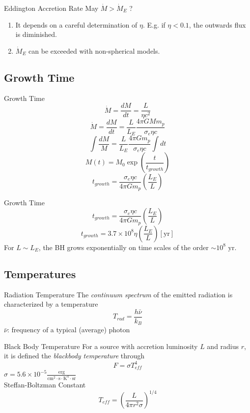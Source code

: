 \documentclass{beamer}
\begin{document}
\begin{frame}{Eddington Accretion Rate}
	May $\dot{M} > \dot{M}_E$ ?
	\pause
	\begin{enumerate}
		\item It depends on a careful determination of $\eta$. E.g. if $\eta < 0.1$, the outwards flux is diminished.
		\pause
		\item $\dot{M}_E$ can be exceeded with non-spherical models.
	\end{enumerate}
\end{frame}

\subsection{Growth Time}
\begin{frame}{Growth Time}
	\[ \dot{M} = \frac{dM}{dt} = \frac{L}{\eta c^2} \]
	\pause
	\[ \dot{M} = \frac{dM}{dt} = \frac{L}{L_E} \frac{4 \pi GM m_p}{\sigma_e \eta c} \]
	\pause
	\[ \int \frac{dM}{M} = \frac{L}{L_E} \frac{4 \pi G m_p}{\sigma_e \eta c} \int dt \]
	\pause
	\[ M(t) = M_0 \exp \left( \frac{t}{t_{growth} }\right) \]
	\pause
	\[ t_{growth} = \frac{\sigma_e \eta c}{4 \pi G m_p} \left( \frac{L_E}{L} \right) \]
\end{frame}

\begin{frame}{Growth Time}
	\[ t_{growth} = \frac{\sigma_e \eta c}{4 \pi G m_p} \left( \frac{L_E}{L} \right) \]
	\pause
	\[ t_{growth} = 3.7 \times 10^8 \eta \left( \frac{L_E}{L} \right) [\textrm{yr}]\]
	\pause
	\footnotesize
	For $L \sim L_E$, the BH grows exponentially on time scales of the order $\sim 10^8 \textrm{ yr}$.
\end{frame}

\subsection{Temperatures}
\begin{frame}{Radiation Temperature}
	The \textit{continuum spectrum} of the emitted radiation is characterized by a temperature
	\[ T_{rad} = \frac{h\bar{\nu}}{k_B}\]
	\pause	
	$\bar{\nu}$: frequency of a typical (average) photon
\end{frame}

\begin{frame}{Black Body Temperature}
	For a source with accretion luminosity $L$ and radius $r$, it is defined the \textit{blackbody temperature} through
	\[F= \sigma T_{eff}^4 \]
	\pause	
	$\sigma = 5.6 \times 10^{-5} \frac{\textrm{erg}}{\textrm{cm}^2 \cdot \textrm{s} \cdot \textrm{K}^4 \cdot \textrm{sr}}$\\
	Steffan-Boltzman Constant
	\pause
	\[ T_{eff} = \left( \frac{L}{4\pi r^2 \sigma} \right)^{1/4} \]
\end{frame}
\end{document}
